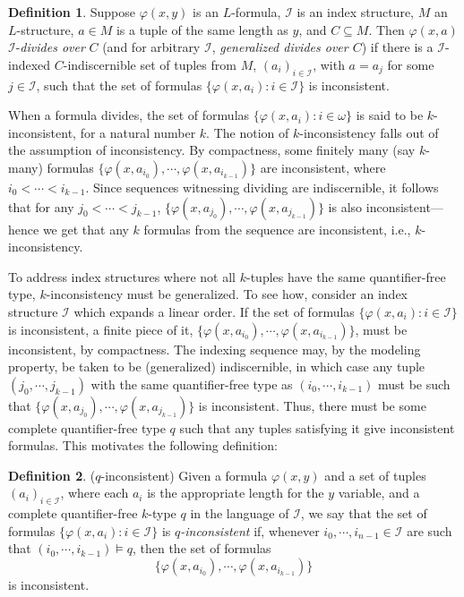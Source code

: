 \documentclass{article}
\newcommand{\calI}{\mathcal{I}}
\newcommand{\vphi}{\varphi}
\theoremstyle{definition}
\newtheorem{definition}{Definition}
\theoremstyle{definition}
\theoremstyle{definition}
\theoremstyle{definition}
\begin{document}
\begin{definition}
   Suppose $\vphi(x,y)$ is an $L$-formula, $\calI$ is an index structure, $M$ an $L$-structure, $a\in M$ is a tuple of the same length as $y$, and $C\subseteq M$. Then $\vphi(x,a)$ $\calI$-\textit{divides over} $C$ (and for arbitrary $\calI$, \textit{generalized divides over $C$}) if there is a $\calI$-indexed $C$-indiscernible set of tuples from $M$, $(a_i)_{i\in\calI}$, with $a=a_j$ for some $j\in\calI$, such that the set of formulas $\{\vphi(x,a_i)\colon i\in\calI\}$ is inconsistent. 
\end{definition}


When a formula divides, the set of formulas $\{\vphi(x,a_i)\colon i\in\omega\}$ is said to be $k$-inconsistent, for a natural number $k$. The notion of $k$-inconsistency falls out of the assumption of inconsistency. By compactness, some finitely many (say $k$-many) formulas $\{\vphi(x, a_{i_0}),\dotsm, \vphi(x,a_{i_{k-1}})\}$ are inconsistent, where $i_0<\dotsm <i_{k-1}$. Since sequences witnessing dividing are indiscernible, it follows that for any $j_0<\dotsm<j_{k-1}$, $\{\vphi(x, a_{j_0}),\dotsm, \vphi(x,a_{j_{k-1}})\}$ is also inconsistent---hence we get that any $k$ formulas from the sequence are inconsistent, i.e., $k$-inconsistency. 

To address index structures where not all $k$-tuples have the same quantifier-free type, $k$-inconsistency must be generalized. To see how, consider an index structure $\calI$ which expands a linear order. If the set of formulas $\{\vphi(x,a_i)\colon i\in\calI\}$ is inconsistent, a finite piece of it, $\{\vphi(x, a_{i_0}),\dotsm, \vphi(x,a_{i_{k-1}})\}$, must be inconsistent, by compactness. The indexing sequence may, by the modeling property, be taken to be (generalized) indiscernible, in which case any tuple $(j_0,\dotsm, j_{k-1})$ with the same quantifier-free type as $(i_0,\dotsm, i_{k-1})$ must be such that $\{\vphi(x, a_{j_0}),\dotsm, \vphi(x,a_{j_{k-1}})\}$ is inconsistent. Thus, there must be some complete quantifier-free type $q$ such that any tuples satisfying it give inconsistent formulas. This motivates the following definition: 

\begin{definition}{($q$-inconsistent)} Given a formula $\vphi(x,y)$ and a set of tuples $(a_i)_{i\in\calI}$, where each $a_i$ is the appropriate length for the $y$ variable, and a complete quantifier-free $k$-type $q$ in the language of $\calI$, we say that the set of formulas $\{\vphi(x,a_i)\colon i\in\calI\}$ is $q$\textit{-inconsistent} if, whenever $i_0,\dotsm, i_{n-1}\in \calI$ are such that $(i_0,\dotsm, i_{k-1})\models q$, then the set of formulas $$\{\vphi(x, a_{i_0}),\dotsm, \vphi(x,a_{i_{k-1}})\}$$
is inconsistent.
\end{definition}
\end{document}
